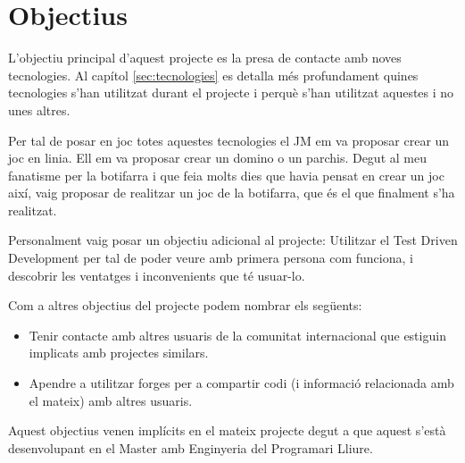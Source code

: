\chapter{Objectius}

L'objectiu principal d'aquest projecte es la presa de contacte amb noves tecnologies. Al capítol \ref{sec:tecnologies} es detalla més profundament quines tecnologies s'han utilitzat durant el projecte i perquè s'han utilitzat aquestes i no unes altres. 

Per tal de posar en joc totes aquestes tecnologies el JM em va proposar crear un joc en linia. Ell em va proposar crear un domino o un parchis. Degut al meu fanatisme per la botifarra i que feia molts dies que havia pensat en crear un joc així, vaig proposar de realitzar un joc de la botifarra, que és el que finalment s'ha realitzat. 

Personalment vaig posar un objectiu adicional al projecte: Utilitzar el Test Driven Development per tal de poder veure amb primera persona com funciona, i descobrir les ventatges i inconvenients que té usuar-lo. 

Com a altres objectius del projecte podem nombrar els següents: 
\begin{itemize}
	\item{Tenir contacte amb altres usuaris de la comunitat internacional que estiguin implicats amb projectes similars.}
	\item{Apendre a utilitzar forges per a compartir codi (i informació relacionada amb el mateix) amb altres usuaris.}
\end{itemize} 

Aquest objectius venen implícits en el mateix projecte degut a que aquest s'està desenvolupant en el Master amb Enginyeria del Programari Lliure. 

